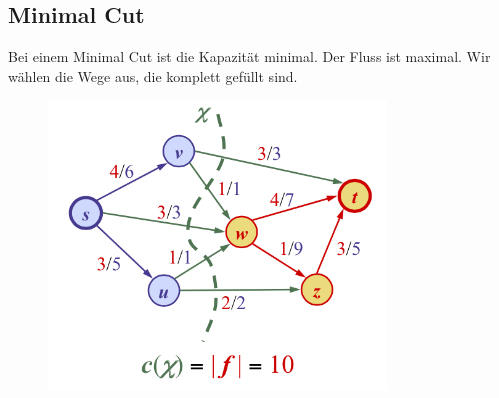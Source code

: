 \documentclass[a4paper,10pt]{report}
\begin{document}
\subsection{Minimal Cut}
Bei einem Minimal Cut ist die Kapazität minimal. Der Fluss ist maximal. Wir wählen die Wege aus, die komplett gefüllt sind.
\begin{figure}[H]
	\begin{center}
  		\includegraphics[width=0.8\textwidth]{img/minimalcut.png}
	\end{center}
\end{figure}
\newpage
\end{document}

